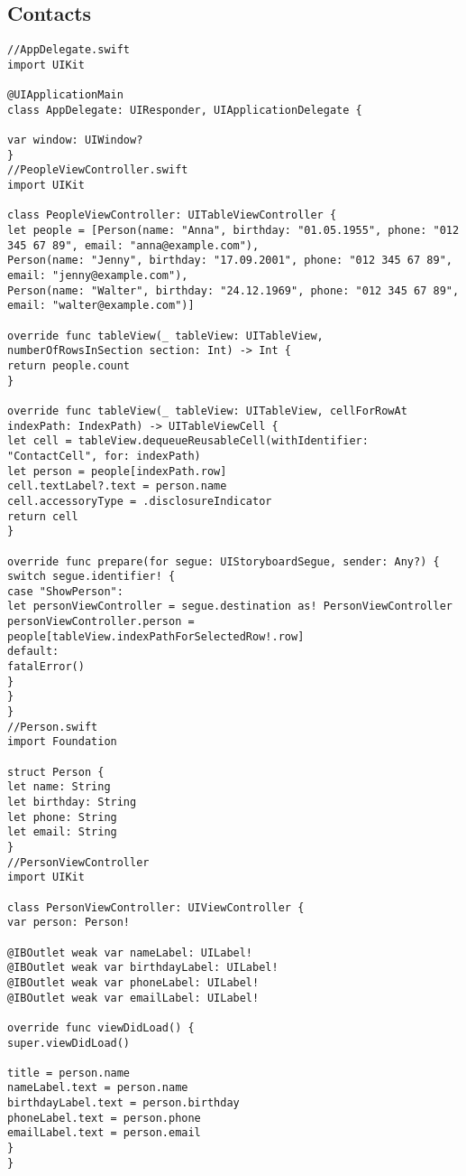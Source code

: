 \subsection{Contacts}
\begin{lstlisting}
//AppDelegate.swift
import UIKit

@UIApplicationMain
class AppDelegate: UIResponder, UIApplicationDelegate {

var window: UIWindow?
}
//PeopleViewController.swift
import UIKit

class PeopleViewController: UITableViewController {
let people = [Person(name: "Anna", birthday: "01.05.1955", phone: "012 345 67 89", email: "anna@example.com"),
Person(name: "Jenny", birthday: "17.09.2001", phone: "012 345 67 89", email: "jenny@example.com"),
Person(name: "Walter", birthday: "24.12.1969", phone: "012 345 67 89", email: "walter@example.com")]

override func tableView(_ tableView: UITableView, numberOfRowsInSection section: Int) -> Int {
return people.count
}

override func tableView(_ tableView: UITableView, cellForRowAt indexPath: IndexPath) -> UITableViewCell {
let cell = tableView.dequeueReusableCell(withIdentifier: "ContactCell", for: indexPath)
let person = people[indexPath.row]
cell.textLabel?.text = person.name
cell.accessoryType = .disclosureIndicator
return cell
}

override func prepare(for segue: UIStoryboardSegue, sender: Any?) {
switch segue.identifier! {
case "ShowPerson":
let personViewController = segue.destination as! PersonViewController
personViewController.person = people[tableView.indexPathForSelectedRow!.row]
default:
fatalError()
}
}
}
//Person.swift
import Foundation

struct Person {
let name: String
let birthday: String
let phone: String
let email: String
}
//PersonViewController
import UIKit

class PersonViewController: UIViewController {
var person: Person!

@IBOutlet weak var nameLabel: UILabel!
@IBOutlet weak var birthdayLabel: UILabel!
@IBOutlet weak var phoneLabel: UILabel!
@IBOutlet weak var emailLabel: UILabel!

override func viewDidLoad() {
super.viewDidLoad()

title = person.name
nameLabel.text = person.name
birthdayLabel.text = person.birthday
phoneLabel.text = person.phone
emailLabel.text = person.email
}
}
\end{lstlisting}

